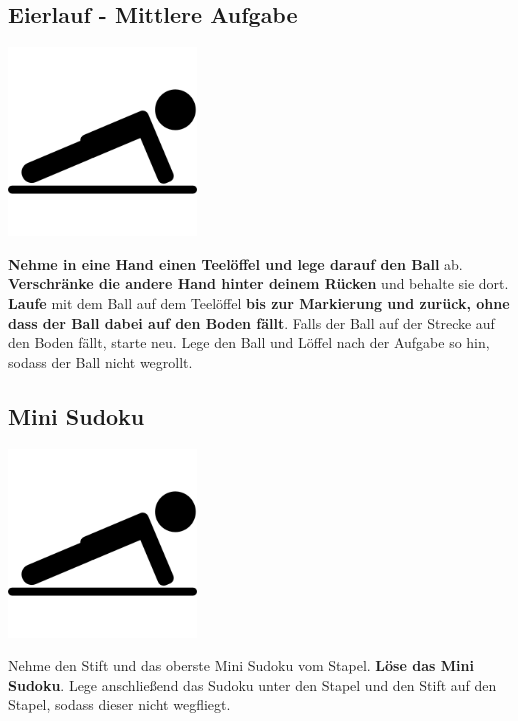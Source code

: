 \subsection{Eierlauf - Mittlere Aufgabe}
\vfill
\begin{center}
    \includegraphics[height=5cm]{graphics/push_up.png}
\end{center}
\vfill
\textbf{Nehme in eine Hand einen Teelöffel und lege darauf den Ball}
ab.
\textbf{Verschränke die andere Hand hinter deinem Rücken} und behalte sie dort.
\textbf{Laufe} mit dem Ball auf dem Teelöffel \textbf{bis zur Markierung und
zurück, ohne dass
der Ball dabei auf den Boden fällt}. Falls der Ball auf der Strecke auf den Boden
fällt, starte neu.
Lege den Ball und Löffel nach der Aufgabe so hin, sodass der Ball nicht
wegrollt.
\newline
\newpage

\subsection{Mini Sudoku}
\vfill
\begin{center}
    \includegraphics[height=5cm]{graphics/push_up.png}
\end{center}
\vfill
Nehme den Stift und das oberste Mini Sudoku vom Stapel.
\textbf{Löse das Mini Sudoku}.
Lege anschließend das Sudoku unter den Stapel und den Stift auf den Stapel,
sodass dieser nicht wegfliegt.
\newline
\newpage
